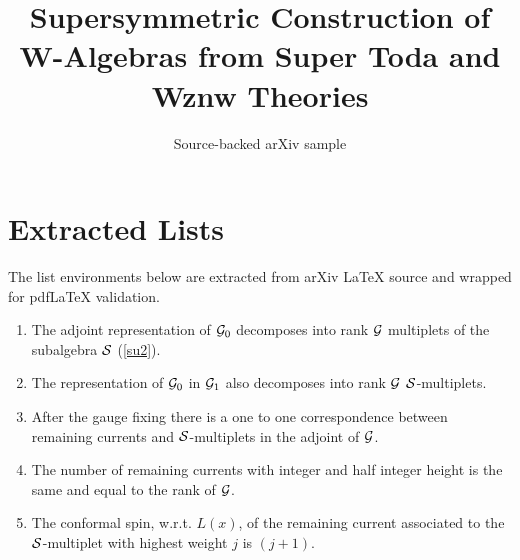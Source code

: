 \documentclass[11pt]{article}
\title{Supersymmetric Construction of W-Algebras from Super Toda and Wznw
  Theories}
\author{Source-backed arXiv sample}
\date{}
\begin{document}
\maketitle
\section{Extracted Lists}

The list environments below are extracted from arXiv LaTeX source and wrapped for pdfLaTeX validation.

\begin{enumerate}
\item The adjoint representation of ${\cal G}_0$ decomposes into rank $\cal
G$ multiplets of the subalgebra $\cal S$ (\ref{su2}).
\item The representation of ${\cal G}_0$ in ${\cal G}_1$ also decomposes
into rank $\cal G$ $\cal S$-multiplets.
\item After the gauge fixing there is a one to one correspondence between
remaining currents and $\cal S$-multiplets in the adjoint of $\cal G$.
\item The number of remaining currents with integer and half integer height is
the same and equal to the rank of $\cal G$.
\item The conformal spin, w.r.t. $L(x)$, of the remaining current associated
to the $\cal S$-multiplet with highest weight $ j$ is $(j+1)$.
\end{enumerate}
\end{document}
